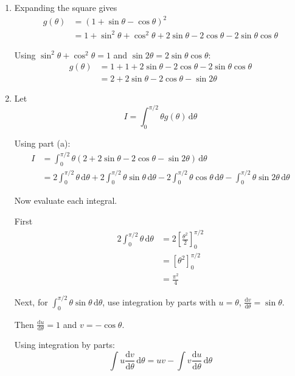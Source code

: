 \documentclass[leqno]{article}
\begin{document}
\begin{enumerate}[
  label=\textbf{\arabic*.},
  leftmargin=*,
  topsep=0pt,
  partopsep=0pt,
  parsep=0pt
]
\vspace*{10pt}

\begin{djsSolution}
\begin{enumerate}[label=\textbf{(\alph*)}]
  \item Expanding the square gives
\begin{align*}
g(\theta)
&=(1+\sin\theta-\cos\theta)^2 \\
&=1+\sin^2\theta+\cos^2\theta+2\sin\theta-2\cos\theta-2\sin\theta\cos\theta
\end{align*}

Using \(\sin^2\theta+\cos^2\theta=1\) and \(\sin 2\theta=2\sin\theta\cos\theta\):
\begin{align*}
g(\theta)
&=1+1+2\sin\theta-2\cos\theta-2\sin\theta\cos\theta \\
&=2+2\sin\theta-2\cos\theta-\sin 2\theta
\end{align*}

  \item Let
\[
I=\int_{0}^{\pi/2}\theta g(\theta)\,\mathrm{d}\theta
\]

Using part (a):
\begin{align*}
I
&=\int_{0}^{\pi/2}\theta\left(2+2\sin\theta-2\cos\theta-\sin 2\theta\right)\,\mathrm{d}\theta \\
&=2\int_{0}^{\pi/2}\theta\,\mathrm{d}\theta
+2\int_{0}^{\pi/2}\theta\sin\theta\,\mathrm{d}\theta
-2\int_{0}^{\pi/2}\theta\cos\theta\,\mathrm{d}\theta
-\int_{0}^{\pi/2}\theta\sin 2\theta\,\mathrm{d}\theta
\end{align*}

Now evaluate each integral.

First
\begin{align*}
2\int_{0}^{\pi/2}\theta\,\mathrm{d}\theta
&=2\left[\frac{\theta^2}{2}\right]_{0}^{\pi/2} \\
&=\left[\theta^2\right]_{0}^{\pi/2} \\
&=\frac{\pi^2}{4}
\end{align*}

Next, for \(\int_{0}^{\pi/2}\theta\sin\theta\,\mathrm{d}\theta\), use integration by parts with
\(u=\theta\), \(\frac{\mathrm{d}v}{\mathrm{d}\theta}=\sin\theta\).

Then \(\frac{\mathrm{d}u}{\mathrm{d}\theta}=1\) and \(v=-\cos\theta\).

Using integration by parts:
\[
\int u\frac{\mathrm{d}v}{\mathrm{d}\theta}\,\mathrm{d}\theta = uv - \int v\frac{\mathrm{d}u}{\mathrm{d}\theta}\,\mathrm{d}\theta
\]


\end{enumerate}
\end{djsSolution}
\end{enumerate}
\end{document}
